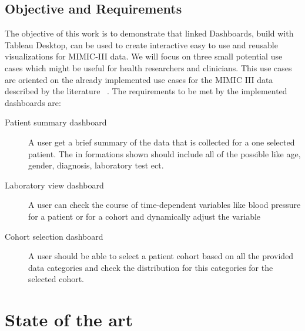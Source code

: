 \documentclass[aac,crcready]{iosart2x}
\begin{document}
\subsection{Objective and Requirements}\label{s1.2}
%
The objective of this work is to demonstrate that linked Dashboards, build with Tableau Desktop, can be used to create interactive easy to use and reusable visualizations for MIMIC-III data. We will focus on three small potential use cases which might be useful for health researchers and clinicians. This use cases are oriented on the already implemented use cases for the MIMIC III data described by the literature ~\cite{Lee.2016, Festag.2019}.
The requirements to be met by the implemented dashboards are:
\begin{description}
\item[Patient summary dashboard] A user get a brief summary of the data that is collected for a one selected patient. The in formations shown should include all of the possible like age, gender, diagnosis, laboratory test ect.
\item[Laboratory view dashboard] A user can check the course of time-dependent variables like blood pressure for a patient or for a cohort and dynamically adjust the variable
\item[Cohort selection dashboard] A user should be able to select a patient cohort based on all the provided data categories and check the distribution for this categories for the selected cohort.
\end{description}

\section{State of the art}\label{s2}
%
\end{document}

